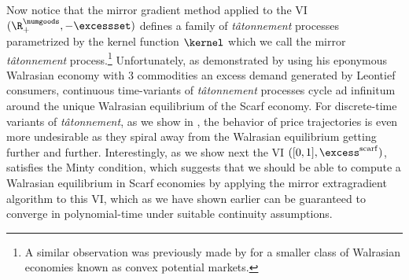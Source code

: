     


Now notice that the mirror gradient method applied to the VI $(\R_+^\numgoods, -\excessset)$ defines a family of \emph{t\^atonnement} processes parametrized by the kernel function $\kernel$ which we call the mirror \emph{t\^atonnement} process.\footnote{A similar observation was previously made by \citet{fisher-tatonnement} for a smaller class of Walrasian economies known as convex potential markets.} Unfortunately, as demonstrated by \citet{scarf1960instable} using his eponymous Walrasian economy with 3 commodities an excess demand generated by Leontief consumers, continuous time-variants of \emph{t\^atonnement} processes cycle ad infinitum around the unique Walrasian equilibrium of the Scarf economy. For discrete-time variants of \emph{t\^atonnement}, as we show in , the behavior of price trajectories is even more undesirable as they spiral away from the Walrasian equilibrium getting further and further. Interestingly, as we show next the VI $([0, 1], \excess^{\mathrm{scarf}})$, satisfies the Minty condition, which suggests that we should be able to compute a Walrasian equilibrium in Scarf economies by applying the mirror extragradient algorithm to this VI, which as we have shown earlier can be guaranteed to converge in polynomial-time under suitable continuity assumptions. 

